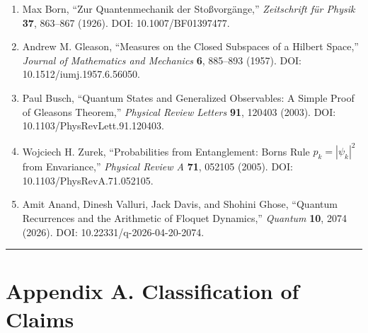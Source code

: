 \documentclass[
  a4paper,
  10pt]{article}
\providecommand{\tightlist}{%
  \setlength{\itemsep}{0pt}\setlength{\parskip}{0pt}}
\begin{document}
\begin{enumerate}
\def\labelenumi{\arabic{enumi}.}
\setcounter{enumi}{4}
\tightlist
\item
  Max Born, ``Zur Quantenmechanik der Stoßvorgänge,'' \emph{Zeitschrift
  für Physik} \textbf{37}, 863--867 (1926). DOI: 10.1007/BF01397477.
\item
  Andrew M. Gleason, ``Measures on the Closed Subspaces of a Hilbert
  Space,'' \emph{Journal of Mathematics and Mechanics} \textbf{6},
  885--893 (1957). DOI: 10.1512/iumj.1957.6.56050.
\item
  Paul Busch, ``Quantum States and Generalized Observables: A Simple
  Proof of Gleason\textquotesingle s Theorem,'' \emph{Physical Review
  Letters} \textbf{91}, 120403 (2003). DOI:
  10.1103/PhysRevLett.91.120403.
\item
  Wojciech H. Zurek, ``Probabilities from Entanglement:
  Born\textquotesingle s Rule \(p_k=|\psi_k|^2\) from Envariance,''
  \emph{Physical Review A} \textbf{71}, 052105 (2005). DOI:
  10.1103/PhysRevA.71.052105.
\item
  Amit Anand, Dinesh Valluri, Jack Davis, and Shohini Ghose, ``Quantum
  Recurrences and the Arithmetic of Floquet Dynamics,'' \emph{Quantum}
  \textbf{10}, 2074 (2026). DOI: 10.22331/q-2026-04-20-2074.
\end{enumerate}

\begin{center}\rule{0.5\linewidth}{0.5pt}\end{center}

\section{Appendix A. Classification of
Claims}\label{appendix-a-classification-of-claims}
\end{document}
